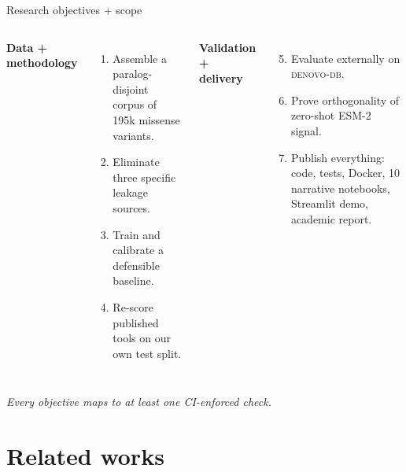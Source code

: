 \documentclass[aspectratio=169,10pt]{beamer}
\begin{document}
\begin{frame}{Research objectives + scope}
  \begin{columns}[T]
    \textbf{Data + methodology}
    \begin{enumerate}
      \item Assemble a paralog-disjoint corpus of 195k missense
            variants.
      \item Eliminate three specific leakage sources.
      \item Train and calibrate a defensible baseline.
      \item Re-score published tools on our own test split.
    \end{enumerate}

    \textbf{Validation + delivery}
    \begin{enumerate}\setcounter{enumi}{4}
      \item Evaluate externally on \textsc{denovo-db}.
      \item Prove orthogonality of zero-shot ESM-2 signal.
      \item Publish everything: code, tests, Docker, 10 narrative
            notebooks, Streamlit demo, academic report.
    \end{enumerate}
  \end{columns}

  \vspace{0.7em}
  \centering
  \footnotesize
  \emph{Every objective maps to at least one CI-enforced check.}
\end{frame}

\section{Related works}
\end{document}
